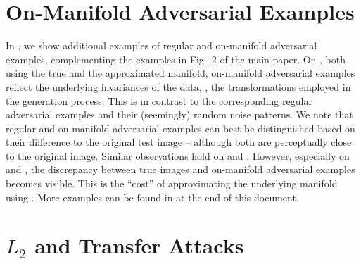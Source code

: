 \begin{appendix}
\section{On-Manifold Adversarial Examples}
\label{sec:appendix-on-manifold}

In , we show additional examples of regular and on-manifold adversarial examples, complementing the examples in Fig.\ 2 of the main paper. On \Fonts, both using the true and the approximated manifold, on-manifold adversarial examples reflect the underlying invariances of the data, \ie, the transformations employed in the generation process. This is in contrast to the corresponding regular adversarial examples and their (seemingly) random noise patterns. We note that regular and on-manifold adversarial examples can best be distinguished based on their difference to the original test image -- although both are perceptually close to the original image. Similar observations hold on \MNIST and \Fashion. However, especially on \Fashion and \Celeb, the discrepancy between true images and on-manifold adversarial examples becomes visible. This is the ``cost'' of approximating the underlying manifold using \VAEGANs. More examples can be found in  at the end of this document.

\section{$L_2$ and Transfer Attacks}
\label{sec:appendix-attacks}


\end{appendix}
